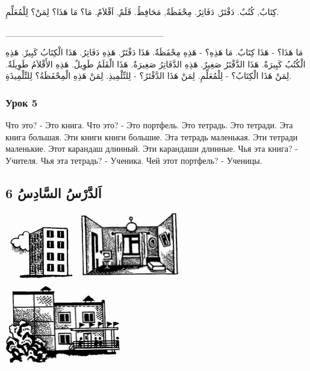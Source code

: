 \documentclass[a5paper]{article}
\begin{document}
كِتَابٌ, كُتُبٌ. دَفْتَرٌ, دَفَاتِرُ. مِحْفَظَةٌ, مَحَافِظُ. قَلَمٌ, اَقْلاَمٌ. مَا؟ مَا هَذَا؟ لِمَنْ؟ لِلْمُعَلِّمِ.

\_\_\_\_\_\_\_\_\_\_\_\_\_\_\_\_\_\_\_\_\_\_\_\_\_

مَا هَذَا؟ - هَذَا كِتَابٌ. مَا هَذِهِ؟ - هَذِهِ مِحْفَظَةٌ. هَذَا دَفْتَرٌ. هَذِهِ دَفَاتِرُ. هَذَا الْكِتَابُ كَبِيرٌ. هَذِهِ الْكُتُبُ كَبِيرَةٌ. هَذَا الدَّفْتَرُ صَغِيرٌ. هَذِهِ الدَّفَاتِرُ صَغِيرَةٌ. هَذَا الْقَلَمُ طَوِيلٌ. هَذِهِ الأَقْلاَمُ طَوِيلَةٌ. لِمَنْ هَذَا الْكِتَابُ؟ - لِلْمُعَلِّمِ. لِمَنْ هَذَا الدَّفْتَرُ؟ - لِلتِّلْمِيذِ. لِمَنْ هَذِهِ الْمِحْفَظَةُ؟ لِلتِّلْمِيذَةِ.

\subsubsection{Урок 5}
Что это? - Это книга. Что это? - Это портфель. Это тетрадь. Это тетради. Эта книга большая. Эти книги книги большие. Эта тетрадь маленькая. Эти тетради маленькие. Этот карандаш длинный. Эти карандаши длинные. Чья эта книга? - Учителя. Чья эта тетрадь? - Ученика. Чей этот портфель? - Ученицы. 

\subsection{اَلدَّرْسُ السَّادِسُ 6}
\  \includegraphics[width=1.1354in,height=1.0937in]{images/MuhammadBagauddinprettified-img006.jpg}   \includegraphics[width=1.8528in,height=1.1965in]{images/MuhammadBagauddinprettified-img007.jpg} \ \  \includegraphics[width=2.0354in,height=1.4374in]{images/MuhammadBagauddinprettified-img008.jpg} 
\end{document}
